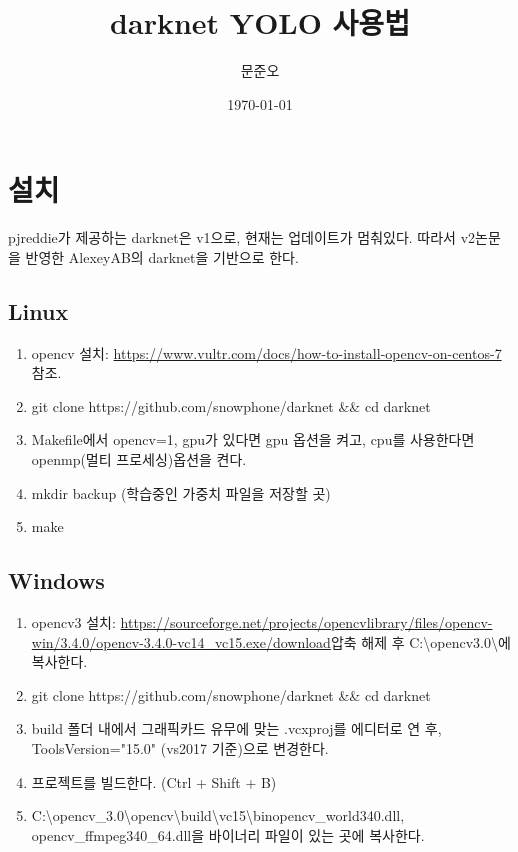 \documentclass[a4paper,12pt]{article}
\begin{document}
 
\title{darknet YOLO 사용법}
\author{문준오}
\date{\today}
\maketitle

\section{설치}
pjreddie가 제공하는 darknet은 v1으로, 현재는 업데이트가 멈춰있다. 따라서 v2논문을 반영한 AlexeyAB의 darknet을 기반으로 한다.
\subsection{Linux}
\begin{enumerate}
	\item opencv 설치: \url{https://www.vultr.com/docs/how-to-install-opencv-on-centos-7} 참조.
	\item git clone https://github.com/snowphone/darknet \&\& cd darknet
	\item Makefile에서 opencv=1, gpu가 있다면 gpu 옵션을 켜고, cpu를 사용한다면 openmp(멀티 프로세싱)옵션을 켠다.
	\item mkdir backup (학습중인 가중치 파일을 저장할 곳)
	\item make
\end{enumerate}


\subsection{Windows}
\begin{enumerate}
	\item opencv3 설치: \url{https://sourceforge.net/projects/opencvlibrary/files/opencv-win/3.4.0/opencv-3.4.0-vc14\_vc15.exe/download}압축 해제 후 C:\textbackslash opencv3.0\textbackslash 에 복사한다.
	\item git clone https://github.com/snowphone/darknet \&\& cd darknet
	\item build 폴더 내에서 그래픽카드 유무에 맞는 .vcxproj를 에디터로 연 후, ToolsVersion="15.0" (vs2017 기준)으로 변경한다.
	\item 프로젝트를 빌드한다. (Ctrl + Shift + B)
	\item C:\textbackslash opencv\_3.0\textbackslash opencv\textbackslash build\textbackslash vc15\textbackslash bin opencv\_world340.dll, opencv\_ffmpeg340\_64.dll을 바이너리 파일이 있는 곳에 복사한다.
\end{enumerate}
\end{document}
